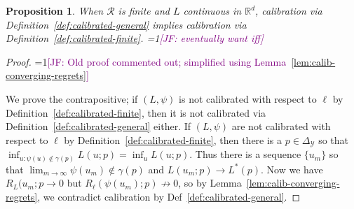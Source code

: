 \documentclass{article}
\newcommand{\Comments}{1}
\newcommand{\mynote}[2]{\ifnum\Comments=1\textcolor{#1}{#2}\fi}
\newcommand{\jessie}[1]{\mynote{purple}{[JF: #1]}}
\newcommand{\reals}{\mathbb{R}}
\newcommand{\simplex}{\Delta_\Y}
\newcommand{\R}{\mathcal{R}}
\newcommand{\Y}{\mathcal{Y}}
\newcommand{\risk}[1]{#1^*}
\newtheorem{proposition}{Proposition}
\begin{document}
\begin{proposition}
	When $\R$ is finite and $L$ continuous in $\reals^d$, calibration via Definition~\ref{def:calibrated-general} implies calibration via Definition~\ref{def:calibrated-finite}.
	\jessie{eventually want iff}
\end{proposition}
\begin{proof}
	\jessie{Old proof commented out; simplified using Lemma~\ref{lem:calib-converging-regrets}}

	We prove the contrapositive; if $(L, \psi)$ is not calibrated with respect to $\ell$ by Definition~\ref{def:calibrated-finite}, then it is not calibrated via Definition~\ref{def:calibrated-general} either.
	If $(L, \psi)$ are not calibrated with respect to $\ell$ by Definition~\ref{def:calibrated-finite}, then there is a $p \in \simplex$ so that $\inf_{u : \psi(u) \not \in \gamma(p)} L(u;p) = \inf_u L(u; p)$.
	Thus there is a sequence $\{u_m\}$ so that $\lim_{m \to \infty} \psi(u_m) \not \in \gamma(p)$ and $L(u_m; p) \to \risk{L}(p)$.  
	Now we have $R_L(u_m; p \to 0$ but $R_\ell(\psi(u_m); p) \not \to 0$, so by Lemma~\ref{lem:calib-converging-regrets}, we contradict calibration by Def~\ref{def:calibrated-general}.

%	
%	
		
	
\end{proof}
\end{document}
